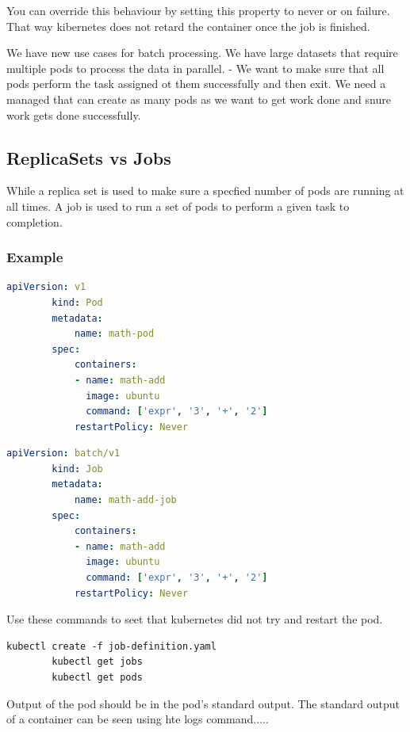 \documentclass[11pt]{book}
\begin{document}
    You can override this behaviour by setting this property to never or on failure.
    That way kibernetes does not retard the container once the job is finished.

    We have new use cases for batch processing.
    We have large datasets that require multiple pods to process the data in parallel.
    - We want to make sure that all pods perform the task assigned ot them successfully and then exit.
    We need a managed that can create as many pods as we want to get work done and snure work gets done successfully.

    \subsection{ReplicaSets vs Jobs}
    While a replica set is used to make sure a specfied number of pods are running at all times.
    A job is used to run a set of pods to perform a given task to completion.

    \subsubsection{Example}
    \begin{lstlisting}[language=yaml, caption={Pod definition file}]
        apiVersion: v1
        kind: Pod
        metadata:
            name: math-pod
        spec:
            containers:
            - name: math-add
              image: ubuntu
              command: ['expr', '3', '+', '2']
            restartPolicy: Never
    \end{lstlisting}

    \begin{lstlisting}[language=yaml, caption={Job definition file}]
        apiVersion: batch/v1
        kind: Job
        metadata:
            name: math-add-job
        spec:
            containers:
            - name: math-add
              image: ubuntu
              command: ['expr', '3', '+', '2']
            restartPolicy: Never
    \end{lstlisting}

    Use these commands to seet that kubernetes did not try and restart the pod.

    \begin{lstlisting}[language=terminal, caption={Sumnmary of commands}]
        kubectl create -f job-definition.yaml
        kubectl get jobs
        kubectl get pods
    \end{lstlisting}

    Output of the pod should be in the pod's standard output.
    The standard output of a container can be seen using hte logs command.....
\end{document}

